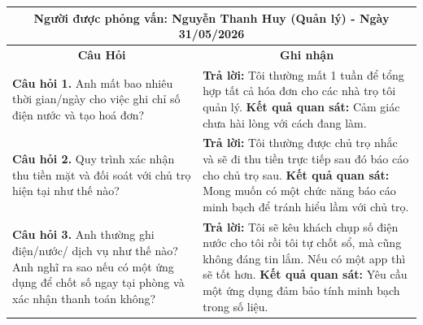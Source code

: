 \documentclass[a4paper,oneside]{report}
\begin{document}
\vspace{0.5cm}

\noindent
\begin{tabularx}{\textwidth}{|p{}|X|}
\hline
\multicolumn{2}{|c|}{\textbf{Người được phỏng vấn: Nguyễn Thanh Huy (Quản lý) - Ngày 31/05/2026}} \\ \hline
\multicolumn{1}{|c}{\textbf{Câu Hỏi}} & \multicolumn{1}{|c|}{\textbf{Ghi nhận}} \\ \hline
\textbf{\color{red}Câu hỏi 1.} Anh mất bao nhiêu thời gian/ngày cho việc ghi chỉ số điện nước và tạo hoá đơn? & \textbf{\color{red}Trả lời:} Tôi thường mất 1 tuần để tổng hợp tất cả hóa đơn cho các nhà trọ tôi quản lý. \newline
\textbf{\color{red}Kết quả quan sát:} Cảm giác chưa hài lòng với cách đang làm. \\ \hline
\textbf{\color{red}Câu hỏi 2.} Quy trình xác nhận thu tiền mặt và đối soát với chủ trọ hiện tại như thế nào? & \textbf{\color{red}Trả lời:} Tôi thường được chủ trọ nhắc và sẽ đi thu tiền trực tiếp sau đó báo cáo cho chủ trọ sau. \newline
\textbf{\color{red}Kết quả quan sát:} Mong muốn có một chức năng báo cáo minh bạch để tránh hiểu lầm với chủ trọ. \\ \hline
\textbf{\color{red}Câu hỏi 3.} Anh thường ghi điện/nước/ dịch vụ như thế nào? Anh nghĩ ra sao nếu có một ứng dụng để chốt số ngay tại phòng và xác nhận thanh toán không? & \textbf{\color{red}Trả lời:} Tôi sẽ kêu khách chụp số điện nước cho tôi rồi tôi tự chốt sổ, mà cũng không đáng tin lắm. Nếu có một app thì sẽ tốt hơn. \newline
\textbf{\color{red}Kết quả quan sát:} Yêu cầu một ứng dụng đảm bảo tính minh bạch trong số liệu. \\ \hline
\end{tabularx}

\vspace{0.5cm}
\end{document}
